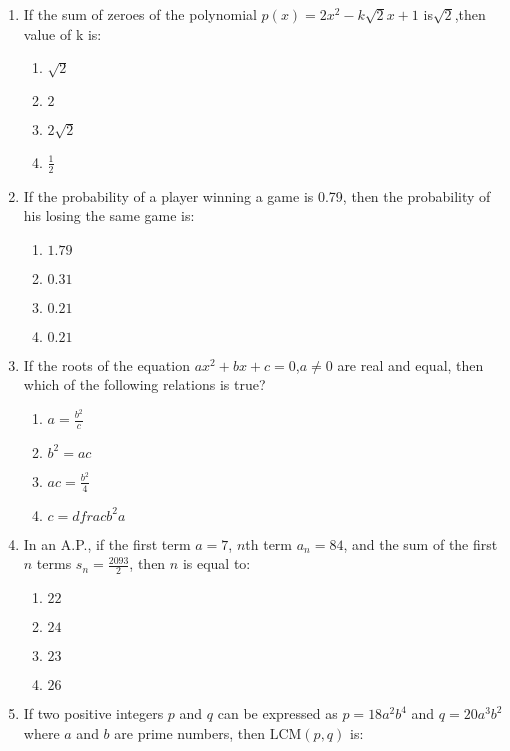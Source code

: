 \documentclass[12pt,-letter paper]{article}
\providecommand{\brak}[1]{\ensuremath{\left(#1\right)}}
\providecommand{\brak}[1]{\ensuremath{\left(#1\right)}}
\begin{document}
\begin{enumerate}

\item If the sum of zeroes of the polynomial $ p\brak x = 2x^2 - k\sqrt2x+1 $ is${\sqrt2} $,then value of k is:
\begin{enumerate}
    \item $ \sqrt{2} $
    \item $2$
    \item $ 2  \sqrt{2} $
    \item $ \frac{1}{2} $
 \end{enumerate}

\item If the probability of a player winning a game is 0.79, then the probability of his losing the same game is:
\begin{enumerate}    
    \item $1.79$
    \item $0.31$
    \item $0.21	$                                                                                     \item $0.21$
\end{enumerate}
\item If the roots of the equation $ax^2 + bx + c = 0$,$a \neq 0$ are real and equal, then which of the following relations is true?
\begin{enumerate}    
    \item $a = \frac{b^2}{c}$
    \item $b^2 = ac$                                                                                    \item $ac = \frac{b^2}{4}$
    \item $c = dfrac{b^2}{a}$
\end{enumerate}
\item In an A.P., if the first term $a = 7$, $n$th term $a_{n} = 84$, and the sum of the first $n$ terms $s_{n} = \frac{2093}{2}$, then $n$ is equal to:
\begin{enumerate}
    \item $22$
    \item $24$
    \item $23$
    \item $26$
\end{enumerate}
\newpage
\item If two positive integers $p$ and $q$ can be expressed as $p = 18a^2 b^4$ and $q = 20a^3 b^2$ where $a$ and $b$ are prime numbers, then $\text{LCM}(p, q)$ is:

\end{enumerate}
\end{document}
